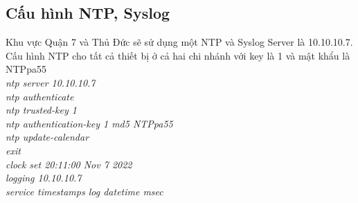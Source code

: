 \documentclass[a4paper, 12pt]{article}
\begin{document}
\subsection{Cấu hình NTP, Syslog}
\hspace*{1cm}Khu vực Quận 7 và Thủ Đức sẽ sử dụng một NTP và Syslog Server là 10.10.10.7.
Cấu hình NTP cho tất cả thiết bị ở cả hai chi nhánh với key là 1 và mật khẩu là NTPpa55\\
\hspace*{2cm}\textit{ntp server 10.10.10.7\\
\hspace*{2cm}ntp authenticate\\
\hspace*{2cm}ntp trusted-key 1\\
\hspace*{2cm}ntp authentication-key 1 md5 NTPpa55\\
\hspace*{2cm}ntp update-calendar \\
\hspace*{2cm}exit\\
\hspace*{2cm}clock set 20:11:00 Nov 7 2022\\
\hspace*{2cm}logging 10.10.10.7\\
\hspace*{2cm}service timestamps log datetime msec\\}
\end{document}
